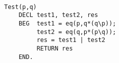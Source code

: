 \begin{program}
\label{prog:test}~
	\begin{lstlisting}
		Test(p,q)
		    DECL test1, test2, res
		    BEG  test1 = eq(p,q*(q\p));
		         test2 = eq(q,p*(p\q));
		         res = test1 | test2
		         RETURN res
		    END.
	\end{lstlisting}
\end{program}